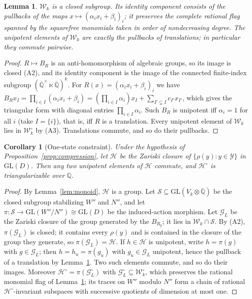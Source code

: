 \documentclass[11pt,letterpaper]{article}
\newcommand{\Q}{\mathbb{Q}}
\newcommand{\Qb}{\overline{\mathbb{Q}}}
\newcommand{\cG}{\mathcal{G}}
\newcommand{\cH}{\mathcal{H}}
\newcommand{\cW}{\mathcal{W}}
\newcommand{\cY}{\mathcal{Y}}
\newcommand{\GL}{\mathrm{GL}}
\newtheorem{lemma}[theorem]{Lemma}
\newtheorem{corollary}[theorem]{Corollary}
\theoremstyle{definition}
\begin{document}
\begin{lemma}\label{lem:wk}
$\cW_k$ is a closed subgroup. Its identity component consists of the pullbacks of the maps $x\mapsto(\alpha_ix_i+\beta_i)_i$; it preserves the complete rational flag spanned by the squarefree monomials taken in order of nondecreasing degree. The unipotent elements of $\cW_k$ are exactly the pullbacks of translations; in particular they commute pairwise.
\end{lemma}
\begin{proof}
$R\mapsto B_R$ is an anti-homomorphism of algebraic groups, so its image is closed (A2), and its identity component is the image of the connected finite-index subgroup $(\Qb^\times\ltimes\Qb)^k$. For $R(x)=(\alpha_ix_i+\beta_i)_i$ we have $B_Rx_I=\prod_{i\in I}(\alpha_ix_i+\beta_i)=(\prod_{i\in I}\alpha_i)x_I+\sum_{I'\subsetneq I}c_{I'}x_{I'}$, which gives the triangular form with diagonal entries $\prod_{i\in I}\alpha_i$. Such $B_R$ is unipotent iff $\alpha_i=1$ for all $i$ (take $I=\{i\}$), that is, iff $R$ is a translation. Every unipotent element of $\cW_k$ lies in $\cW_k^\circ$ by (A3). Translations commute, and so do their pullbacks.
\end{proof}

\begin{corollary}[One-state constraint]\label{cor:onestate}
Under the hypothesis of Proposition~\ref{prop:compression}, let $\cH$ be the Zariski closure of $\{\rho(y):y\in\cY\}$ in $\GL(D)$. Then any two unipotent elements of $\cH$ commute, and $\cH^\circ$ is triangularizable over $\Q$.
\end{corollary}
\begin{proof}
By Lemma~\ref{lem:monoid}, $\cH$ is a group. Let $\mathcal S\subseteq\GL(V_k\otimes\Qb)$ be the closed subgroup stabilizing $W''$ and $N''$, and let $\pi:\mathcal S\to\GL(W''/N'')\cong\GL(D)$ be the induced-action morphism. Let $\cG_L$ be the Zariski closure of the group generated by the $B_{R_y}$; it lies in $\cW_k\cap\mathcal S$. By (A2), $\pi(\cG_L)$ is closed; it contains every $\rho(y)$ and is contained in the closure of the group they generate, so $\pi(\cG_L)=\cH$. If $h\in\cH$ is unipotent, write $h=\pi(g)$ with $g\in\cG_L$; then $h=h_u=\pi(g_u)$ with $g_u\in\cG_L$ unipotent, hence the pullback of a translation by Lemma~\ref{lem:wk}. Two such elements commute, and so do their images. Moreover $\cH^\circ=\pi(\cG_L^\circ)$ with $\cG_L^\circ\subseteq\cW_k^\circ$, which preserves the rational monomial flag of Lemma~\ref{lem:wk}; its traces on $W''$ modulo $N''$ form a chain of rational $\cH^\circ$-invariant subspaces with successive quotients of dimension at most one.
\end{proof}
\end{document}
